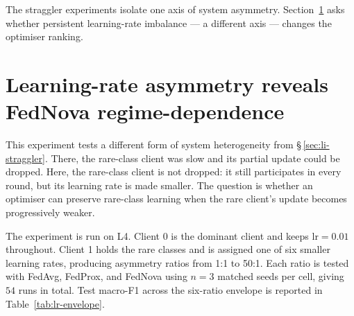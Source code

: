 \documentclass[11pt,a4paper]{report}
\begin{document}
The straggler experiments isolate one axis of system asymmetry.
Section~\ref{sec:lr-asymmetry} asks whether persistent learning-rate
imbalance --- a different axis --- changes the optimiser ranking.





\section{Learning-rate asymmetry reveals FedNova regime-dependence}
\label{sec:lr-asymmetry}

This experiment tests a different form of system heterogeneity from
\S\,\ref{sec:li-straggler}. There, the rare-class client was slow and its
partial update could be dropped. Here, the rare-class client is not dropped:
it still participates in every round, but its learning rate is made smaller.
The question is whether an optimiser can preserve rare-class learning when
the rare client's update becomes progressively weaker.

The experiment is run on L4. Client 0 is the dominant client and keeps
$\textrm{lr}=0.01$ throughout. Client 1 holds the rare classes and is assigned
one of six smaller learning rates, producing asymmetry ratios from 1:1 to
50:1. Each ratio is tested with FedAvg, FedProx, and FedNova using $n=3$
matched seeds per cell, giving $54$ runs in total. Test macro-F1 across the
six-ratio envelope is reported in Table~\ref{tab:lr-envelope}.
\end{document}
